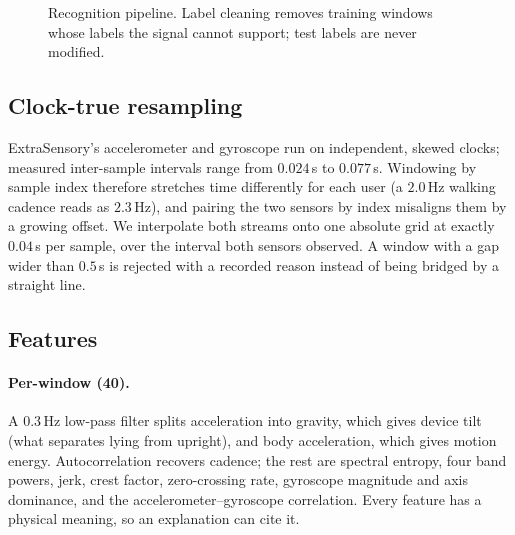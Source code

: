 \documentclass[11pt,a4paper]{article}
\begin{document}
\begin{figure}[H]
\centering
{}
\caption{Recognition pipeline. Label cleaning removes training windows whose labels the
signal cannot support; test labels are never modified.}
\label{fig:pipeline}
\end{figure}

\subsection{Clock-true resampling}
ExtraSensory's accelerometer and gyroscope run on independent, skewed clocks; measured
inter-sample intervals range from $0.024$\,s to $0.077$\,s. Windowing by sample index
therefore stretches time differently for each user (a $2.0$\,Hz walking cadence reads as
$2.3$\,Hz), and pairing the two sensors by index misaligns them by a growing offset. We
interpolate both streams onto one absolute grid at exactly $0.04$\,s per sample, over the
interval both sensors observed. A window with a gap wider than $0.5$\,s is rejected with
a recorded reason instead of being bridged by a straight line.

\subsection{Features}
\paragraph{Per-window (40).} A $0.3$\,Hz low-pass filter splits acceleration into
gravity, which gives device tilt (what separates lying from upright), and body
acceleration, which gives motion energy. Autocorrelation recovers cadence; the rest are
spectral entropy, four band powers, jerk, crest factor, zero-crossing rate, gyroscope
magnitude and axis dominance, and the accelerometer--gyroscope correlation. Every
feature has a physical meaning, so an explanation can cite it.
\end{document}

